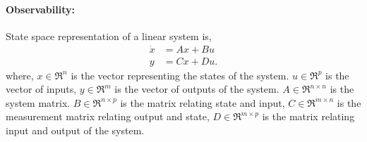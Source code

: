 \paragraph{Observability:}
State space representation of a linear system is,
\begin{equation}
\label{eq:dyn_l}
\begin{split}
\dot{x} &= Ax + Bu\\
y &= Cx + Du.
\end{split}
\end{equation}
where, $x \in \Re^{n}$ is the vector representing the states of the system. $u \in \Re^{p}$ is the vector of inputs, $y \in \Re^{m}$ is the vector of outputs of the system. $A \in \Re^{n \times n}$ is the system matrix. $B \in \Re^{n \times p}$ is the matrix relating state and input, $C \in \Re^{m \times n}$ is the measurement matrix relating output and state, $D \in \Re^{m \times p}$ is the matrix relating input and output of the system.

